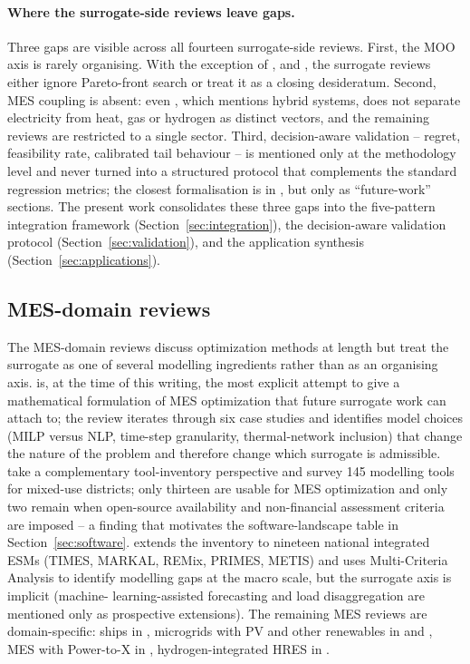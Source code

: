 \paragraph{Where the surrogate-side reviews leave gaps.}
Three gaps are visible across all fourteen surrogate-side reviews.
First, the MOO axis is rarely organising. With the exception of
\cite{DiazManriquez2016}, \cite{Elwy2024} and \cite{Zhang2026_building},
the surrogate reviews either ignore Pareto-front search or treat it
as a closing desideratum. Second, MES coupling is absent: even
\cite{Khan2024_DT}, which mentions hybrid systems, does not separate
electricity from heat, gas or hydrogen as distinct vectors, and the
remaining reviews are restricted to a single sector. Third,
decision-aware validation -- regret, feasibility rate, calibrated
tail behaviour -- is mentioned only at the methodology level and
never turned into a structured protocol that complements the
standard regression metrics; the closest formalisation is in
\cite{Khaloie2025,Lim2025,Tan2026}, but only as ``future-work''
sections. The present work consolidates these three gaps into the
five-pattern integration framework (Section~\ref{sec:integration}),
the decision-aware validation protocol
(Section~\ref{sec:validation}), and the application synthesis
(Section~\ref{sec:applications}).

\subsection{MES-domain reviews}
\label{sec:related-mes}

The MES-domain reviews discuss optimization methods at length but
treat the surrogate as one of several modelling ingredients rather
than as an organising axis. \cite{Manco2024} is, at the time of this
writing, the most explicit attempt to give a mathematical formulation
of MES optimization that future surrogate work can attach to; the
review iterates through six case studies and identifies model
choices (MILP versus NLP, time-step granularity, thermal-network
inclusion) that change the nature of the problem and therefore
change which surrogate is admissible. \cite{Klemm2021} take a
complementary tool-inventory perspective and survey 145 modelling
tools for mixed-use districts; only thirteen are usable for MES
optimization and only two remain when open-source availability and
non-financial assessment criteria are imposed -- a finding that
motivates the software-landscape table in
Section~\ref{sec:software}. \cite{Fattahi2020} extends the inventory
to nineteen national integrated ESMs (TIMES, MARKAL, REMix, PRIMES,
METIS) and uses Multi-Criteria Analysis to identify modelling gaps
at the macro scale, but the surrogate axis is implicit (machine-
learning-assisted forecasting and load disaggregation are mentioned
only as prospective extensions). The remaining MES reviews are
domain-specific: ships in \cite{Mylonopoulos202332697}, microgrids
with PV and other renewables in \cite{agha_kassab_comprehensive_2024}
and \cite{nallolla_multi-objective_2023}, MES with Power-to-X in
\cite{malla_sg_optimization_2024}, hydrogen-integrated HRES in
\cite{Li2025_hydrogen}.

